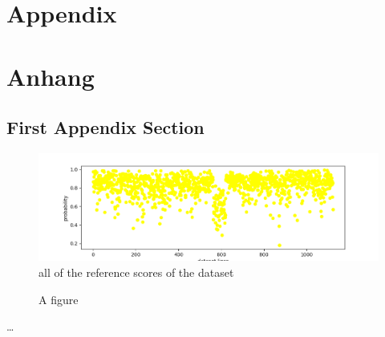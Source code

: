 
{\chapter{Appendix}}    %
{\chapter{Anhang}}      %
\label{chap:appendix}


\section{First Appendix Section}
\label{sec:appendix:FirstSection}
		
\setcounter{figure}{0}

\begin{figure}
    \centering
    \includegraphics[width=\linewidth]{Latex/sections/images/referencesscatterplot.png}
    \caption{all of the reference scores of the dataset}
    \label{fig:reference scatterplot}
\end{figure}
\begin{figure} [ht]
  \centering
  \caption{A figure}
  \label{fig:anotherfigure}
\end{figure}


\dots
